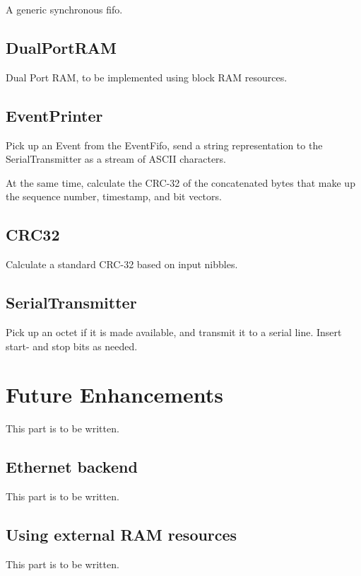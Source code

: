 \documentclass[a4paper,twoside]{report}
\begin{document}
A generic synchronous fifo.

\section{DualPortRAM}

Dual Port RAM, to be implemented using block RAM resources.

\section{EventPrinter}

Pick up an Event from the EventFifo, send a string representation to the SerialTransmitter as a stream of ASCII characters.

At the same time, calculate the CRC-32 of the concatenated bytes that make up the sequence number, timestamp, and bit vectors.

\section{CRC32}

Calculate a standard CRC-32 based on input nibbles.

\section{SerialTransmitter}

Pick up an octet if it is made available, and transmit it to a serial line. Insert start- and stop bits as needed.

\chapter{Future Enhancements}

This part is to be written.

\section{Ethernet backend}

This part is to be written.

\section{Using external RAM resources}

This part is to be written.
\end{document}
